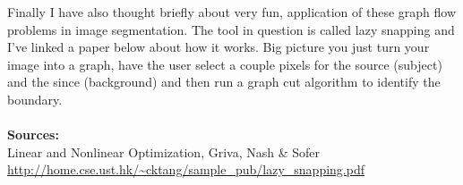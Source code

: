 \documentclass[12pt]{article}
\begin{document}
\begin{enumerate}
	Finally I have also thought briefly about very fun, application of these graph flow problems in image segmentation. The tool in question is called lazy snapping and I've linked a paper below about how it works. Big picture you just turn your image into a graph, have the user select a couple pixels for the source (subject) and the since (background) and then run a graph cut algorithm to identify the boundary. \\ \\

	
	\textbf{Sources:}\\
	Linear and Nonlinear Optimization, Griva, Nash \& Sofer \\
	\url{http://home.cse.ust.hk/~cktang/sample_pub/lazy_snapping.pdf}


\end{enumerate}
\end{document}
